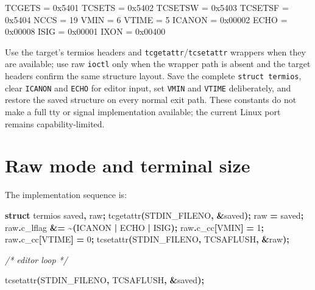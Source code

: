 \documentclass[
  oneside,
  openany]{book}
\newenvironment{Shaded}{\begin{snugshade}}{\end{snugshade}}
\newcommand{\CommentTok}[1]{\textcolor[rgb]{0.56,0.35,0.01}{\textit{#1}}}
\newcommand{\DecValTok}[1]{\textcolor[rgb]{0.00,0.00,0.81}{#1}}
\newcommand{\KeywordTok}[1]{\textcolor[rgb]{0.13,0.29,0.53}{\textbf{#1}}}
\newcommand{\NormalTok}[1]{#1}
\newcommand{\OperatorTok}[1]{\textcolor[rgb]{0.81,0.36,0.00}{\textbf{#1}}}
\begin{document}
\begin{Shaded}
\begin{Highlighting}[]
\NormalTok{TCGETS = 0x5401}
\NormalTok{TCSETS = 0x5402}
\NormalTok{TCSETSW = 0x5403}
\NormalTok{TCSETSF = 0x5404}
\NormalTok{NCCS = 19}
\NormalTok{VMIN = 6}
\NormalTok{VTIME = 5}
\NormalTok{ICANON = 0x00002}
\NormalTok{ECHO = 0x00008}
\NormalTok{ISIG = 0x00001}
\NormalTok{IXON = 0x00400}
\end{Highlighting}
\end{Shaded}

Use the target's termios headers and
\texttt{tcgetattr}/\texttt{tcsetattr} wrappers when they are available;
use raw \texttt{ioctl} only when the wrapper path is absent and the
target headers confirm the same structure layout. Save the complete
\texttt{struct\ termios}, clear \texttt{ICANON} and \texttt{ECHO} for
editor input, set \texttt{VMIN} and \texttt{VTIME} deliberately, and
restore the saved structure on every normal exit path. These constants
do not make a full tty or signal implementation available; the current
Linux port remains capability-limited.

\hypertarget{raw-mode-and-terminal-size}{%
\section{Raw mode and terminal size}\label{raw-mode-and-terminal-size}}

The implementation sequence is:

\begin{Shaded}
\begin{Highlighting}[]
\KeywordTok{struct}\NormalTok{ termios saved}\OperatorTok{,}\NormalTok{ raw}\OperatorTok{;}
\NormalTok{tcgetattr}\OperatorTok{(}\NormalTok{STDIN\_FILENO}\OperatorTok{,} \OperatorTok{\&}\NormalTok{saved}\OperatorTok{);}
\NormalTok{raw }\OperatorTok{=}\NormalTok{ saved}\OperatorTok{;}
\NormalTok{raw}\OperatorTok{.}\NormalTok{c\_lflag }\OperatorTok{\&=} \OperatorTok{\textasciitilde{}(}\NormalTok{ICANON }\OperatorTok{|}\NormalTok{ ECHO }\OperatorTok{|}\NormalTok{ ISIG}\OperatorTok{);}
\NormalTok{raw}\OperatorTok{.}\NormalTok{c\_cc}\OperatorTok{[}\NormalTok{VMIN}\OperatorTok{]} \OperatorTok{=} \DecValTok{1}\OperatorTok{;}
\NormalTok{raw}\OperatorTok{.}\NormalTok{c\_cc}\OperatorTok{[}\NormalTok{VTIME}\OperatorTok{]} \OperatorTok{=} \DecValTok{0}\OperatorTok{;}
\NormalTok{tcsetattr}\OperatorTok{(}\NormalTok{STDIN\_FILENO}\OperatorTok{,}\NormalTok{ TCSAFLUSH}\OperatorTok{,} \OperatorTok{\&}\NormalTok{raw}\OperatorTok{);}

\CommentTok{/* editor loop */}

\NormalTok{tcsetattr}\OperatorTok{(}\NormalTok{STDIN\_FILENO}\OperatorTok{,}\NormalTok{ TCSAFLUSH}\OperatorTok{,} \OperatorTok{\&}\NormalTok{saved}\OperatorTok{);}
\end{Highlighting}
\end{Shaded}
\end{document}
